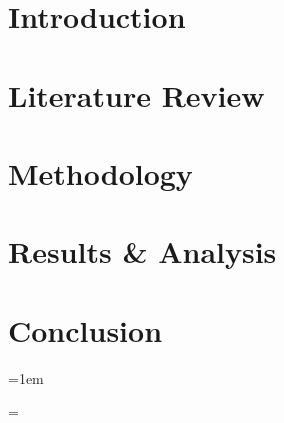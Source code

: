 \documentclass[12pt,letterpaper,oneside]{book}
\begin{document}
\frontmatter
	\flyleaf                        
	\disclaimerpage                 
	\titlepageAFIT                      
	\committeepage  
	
    
    
    
    \tableofcontents
    \listoffigures
    \listoftables
    \listofdefinitions
    \listofabbreviations
    \listofsymbols
    
\mainmatter
	\chapter{Introduction}
    	
    \chapter{Literature Review}
    	
    \chapter{Methodology}
    	
    \chapter{Results \& Analysis}
    	
    \chapter{Conclusion}
    	
        

\backmatter
    \baselineskip=1em
	
	 
    \baselineskip=\normalbaselineskip

	
	
\end{document}
